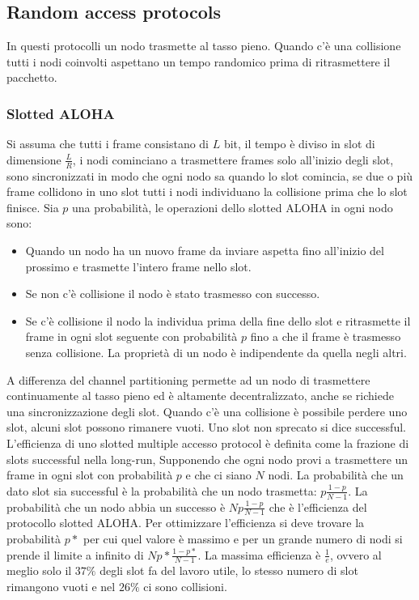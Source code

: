 \subsection{Random access protocols}
In questi protocolli un nodo trasmette al tasso pieno. Quando c'\`e una collisione tutti i nodi coinvolti aspettano un tempo randomico prima di ritrasmettere il pacchetto. 
\subsubsection{Slotted ALOHA}
Si assuma che tutti i frame consistano di $L$ bit, il tempo \`e diviso in slot di dimensione $\frac{L}{R}$, i nodi cominciano a trasmettere frames solo all'inizio degli slot, sono sincronizzati in modo che ogni nodo
sa quando lo slot comincia, se due o pi\`u frame collidono in uno slot tutti i nodi individuano la collisione prima che lo slot finisce. Sia $p$ una probabilit\`a, le operazioni dello slotted ALOHA in ogni nodo sono:
\begin{itemize}
\item Quando un nodo ha un nuovo frame da inviare aspetta fino all'inizio del prossimo e trasmette l'intero frame nello slot.
\item Se non c'\`e collisione il nodo \`e stato trasmesso con successo.
\item Se c'\`e collisione il nodo la individua prima della fine dello slot e ritrasmette il frame in ogni slot seguente con probabilit\`a $p$ fino a che il frame \`e trasmesso senza collisione. La propriet\`a di un nodo
\`e indipendente da quella negli altri.
\end{itemize}
A differenza del channel partitioning permette ad un nodo di trasmettere continuamente al tasso pieno ed \`e altamente decentralizzato, anche se richiede una sincronizzazione degli slot. Quando c'\`e una 
collisione \`e possibile perdere uno slot, alcuni slot possono rimanere vuoti. Uno slot non sprecato si dice successful. L'efficienza di uno slotted multiple accesso protocol \`e definita come la frazione di slots
successful nella long-run, Supponendo che ogni nodo provi a trasmettere un frame in ogni slot con probabilit\`a $p$ e che ci siano $N$ nodi.  La probabilit\`a che un dato slot sia successful \`e la probabilit\`a che
un nodo trasmetta: $p\frac{1-p}{N-1}$. La probabilit\`a che un nodo abbia un successo \`e $Np\frac{1-p}{N-1}$ che \`e l'efficienza del protocollo slotted ALOHA. Per ottimizzare l'efficienza si deve trovare la
probabilit\`a $p*$ per cui quel valore \`e massimo e per un grande numero di nodi si prende il limite a infinito di $Np*\frac{1-p*}{N-1}$. La massima efficienza \`e  $\frac{1}{e}$, ovvero al meglio solo il $37\%$ 
degli slot fa del lavoro utile, lo stesso numero di slot rimangono vuoti e nel $26\%$ ci sono collisioni. 
